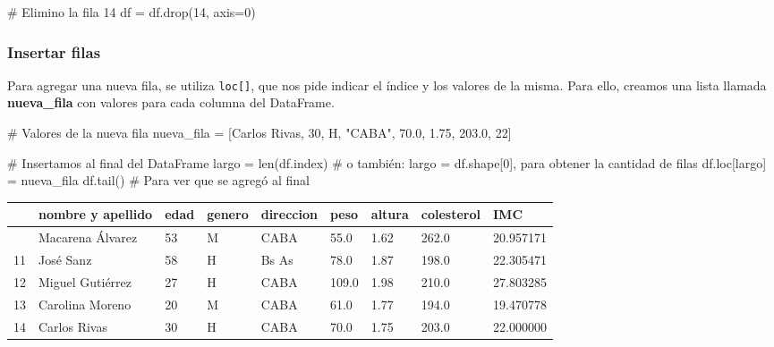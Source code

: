 \documentclass[
  letterpaper,
  DIV=11,
  numbers=noendperiod]{scrreprt}
\newenvironment{Shaded}{\begin{snugshade}}{\end{snugshade}}
\newcommand{\BuiltInTok}[1]{\textcolor[rgb]{0.00,0.23,0.31}{#1}}
\newcommand{\CommentTok}[1]{\textcolor[rgb]{0.37,0.37,0.37}{#1}}
\newcommand{\DecValTok}[1]{\textcolor[rgb]{0.68,0.00,0.00}{#1}}
\newcommand{\FloatTok}[1]{\textcolor[rgb]{0.68,0.00,0.00}{#1}}
\newcommand{\NormalTok}[1]{\textcolor[rgb]{0.00,0.23,0.31}{#1}}
\newcommand{\OperatorTok}[1]{\textcolor[rgb]{0.37,0.37,0.37}{#1}}
\newcommand{\StringTok}[1]{\textcolor[rgb]{0.13,0.47,0.30}{#1}}
\begin{document}
\begin{Shaded}
\begin{Highlighting}[]
\CommentTok{\# Elimino la fila 14}
\NormalTok{df }\OperatorTok{=}\NormalTok{ df.drop(}\DecValTok{14}\NormalTok{, axis}\OperatorTok{=}\DecValTok{0}\NormalTok{) }
\end{Highlighting}
\end{Shaded}

\subsubsection{Insertar filas}\label{insertar-filas}

Para agregar una nueva fila, se utiliza \texttt{loc{[}{]}}, que nos pide
indicar el índice y los valores de la misma. Para ello, creamos una
lista llamada \textbf{nueva\_fila} con valores para cada columna del
DataFrame.

\begin{Shaded}
\begin{Highlighting}[]
\CommentTok{\# Valores de la nueva fila}
\NormalTok{nueva\_fila }\OperatorTok{=}\NormalTok{ [}\StringTok{\textquotesingle{}Carlos Rivas\textquotesingle{}}\NormalTok{, }\DecValTok{30}\NormalTok{, }\StringTok{\textquotesingle{}H\textquotesingle{}}\NormalTok{, }\StringTok{"CABA"}\NormalTok{, }\FloatTok{70.0}\NormalTok{, }\FloatTok{1.75}\NormalTok{, }\FloatTok{203.0}\NormalTok{, }\DecValTok{22}\NormalTok{]}

\CommentTok{\# Insertamos al final del DataFrame}
\NormalTok{largo }\OperatorTok{=} \BuiltInTok{len}\NormalTok{(df.index) }\CommentTok{\# o también: largo = df.shape[0], para obtener la cantidad de filas}
\NormalTok{df.loc[largo] }\OperatorTok{=}\NormalTok{ nueva\_fila}
\NormalTok{df.tail() }\CommentTok{\# Para ver que se agregó al final}
\end{Highlighting}
\end{Shaded}

\begin{longtable}[]{@{}lllllllll@{}}
\toprule\noalign{}
& nombre y apellido & edad & genero & direccion & peso & altura &
colesterol & IMC \\
\midrule\noalign{}
\endhead
\bottomrule\noalign{}
\endlastfoot
10 & Macarena Álvarez & 53 & M & CABA & 55.0 & 1.62 & 262.0 &
20.957171 \\
11 & José Sanz & 58 & H & Bs As & 78.0 & 1.87 & 198.0 & 22.305471 \\
12 & Miguel Gutiérrez & 27 & H & CABA & 109.0 & 1.98 & 210.0 &
27.803285 \\
13 & Carolina Moreno & 20 & M & CABA & 61.0 & 1.77 & 194.0 &
19.470778 \\
14 & Carlos Rivas & 30 & H & CABA & 70.0 & 1.75 & 203.0 & 22.000000 \\
\end{longtable}
\end{document}

